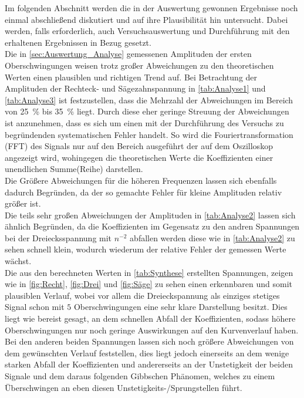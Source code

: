 Im folgenden Abschnitt werden die in der Auswertung gewonnen Ergebnisse
noch einmal abschließend diskutiert und auf ihre Plausibilität hin untersucht.
Dabei werden, falls erforderlich, auch Versuchsauswertung und Durchführung
mit den erhaltenen Ergebnissen in Bezug gesetzt.\\

Die in  \cref{sec:Auswertung_Analyse} gemessenen Amplituden der ersten 
Oberschwingungen weisen trotz großer Abweichungen zu den theoretischen
Werten einen plausiblen und richtigen Trend auf. Bei Betrachtung der 
Amplituden der Rechteck- und Sägezahnspannung in \cref{tab:Analyse1} und 
\ref{tab:Analyse3} ist festzustellen, dass die Mehrzahl der Abweichungen 
im Bereich von \SI{25}{\percent} bis \SI{35}{\percent} liegt. Durch diese
eher geringe Streuung der Abweichungen ist anzunehmen, dass es sich um
einen mit der Durchführung des Versuchs zu begründenden systematischen
Fehler handelt. 
So wird die Fouriertransformation (FFT) des Signals nur auf den Bereich
ausgeführt der auf dem Oszilloskop angezeigt wird, wohingegen die 
theoretischen Werte die Koeffizienten einer unendlichen Summe(Reihe) 
darstellen.\\
Die Größere Abweichungen für die höheren Frequenzen lassen sich ebenfalls 
dadurch Begründen, da der so gemachte Fehler für kleine Amplituden 
relativ größer ist.\\
Die teils sehr großen Abweichungen der Amplituden in \cref{tab:Analyse2} 
lassen sich ähnlich Begründen, da die Koeffizienten im Gegensatz zu den 
andren Spannungen bei der Dreiecksspannung mit $n^{-2}$ abfallen 
werden diese wie in \cref{tab:Analyse2} zu sehen schnell klein, wodurch wiederum 
der relative Fehler der gemessen Werte wächst.\\

Die aus den berechneten Werten in \cref{tab:Synthese} erstellten Spannungen,
zeigen wie in \cref{fig:Recht}, \ref{fig:Drei} und \ref{fig:Säge} zu sehen 
einen erkennbaren und somit plausiblen Verlauf, wobei vor allem die Dreieckspannung
als einziges stetiges Signal schon mit $5$ Oberschwingungen eine sehr klare Darstellung 
besitzt. Dies liegt wie bereist gesagt, an dem schnellen Abfall der Koeffizienten, sodass 
höhere Oberschwingungen nur noch geringe Auswirkungen auf den Kurvenverlauf haben.
Bei den anderen beiden Spannungen lassen sich noch größere Abweichungen von dem gewünschten 
Verlauf feststellen, dies liegt jedoch einerseits an dem wenige starken Abfall der 
Koeffizienten und andererseits an der Unstetigkeit der beiden Signale und dem daraus folgenden
Gibbschen Phänomen, welches zu einem Überschwingen an eben diesen Unstetigkeits-/Sprungstellen
führt.          
